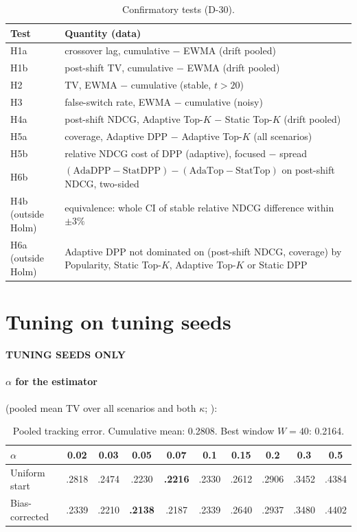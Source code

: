 \documentclass[11pt,a4paper]{article}
\newcommand{\statustag}[2]{\colorbox{#1}{\scriptsize\sffamily\bfseries #2}}
\newcommand{\tuning}{\statustag{gray!20}{TUNING SEEDS ONLY}}
\begin{document}
\begin{table}[h]\centering\small
\begin{tabularx}{\linewidth}{lX}
\toprule
Test & Quantity (data) \\
\midrule
H1a & crossover lag, cumulative $-$ EWMA (drift pooled) \\
H1b & post-shift TV, cumulative $-$ EWMA (drift pooled) \\
H2 & TV, EWMA $-$ cumulative (stable, $t>20$) \\
H3 & false-switch rate, EWMA $-$ cumulative (noisy) \\
H4a & post-shift NDCG, Adaptive Top-$K$ $-$ Static Top-$K$ (drift pooled) \\
H5a & coverage, Adaptive DPP $-$ Adaptive Top-$K$ (all scenarios) \\
H5b & relative NDCG cost of DPP (adaptive), focused $-$ spread \\
H6b & $(\text{AdaDPP}-\text{StatDPP})-(\text{AdaTop}-\text{StatTop})$ on post-shift NDCG, two-sided \\
\midrule
H4b (outside Holm) & equivalence: whole CI of stable relative NDCG difference within $\pm3\%$ \\
H6a (outside Holm) & Adaptive DPP not dominated on (post-shift NDCG, coverage) by Popularity, Static Top-$K$, Adaptive Top-$K$ or Static DPP \\
\bottomrule
\end{tabularx}
\caption{Confirmatory tests (D-30).}
\end{table}

\section{Tuning on tuning seeds}\label{sec:tuning}
\tuning

\paragraph{$\alpha$ for the estimator} (pooled mean TV over all scenarios and both $\kappa$;
):

\begin{table}[h]\centering\small
\begin{tabular}{lccccccccc}
\toprule
$\alpha$ & 0.02 & 0.03 & 0.05 & 0.07 & 0.1 & 0.15 & 0.2 & 0.3 & 0.5 \\
\midrule
Uniform start  & .2818 & .2474 & .2230 & \textbf{.2216} & .2330 & .2612 & .2906 & .3452 & .4384 \\
Bias-corrected & .2339 & .2210 & \textbf{.2138} & .2187 & .2339 & .2640 & .2937 & .3480 & .4402 \\
\bottomrule
\end{tabular}
\caption{Pooled tracking error. Cumulative mean: 0.2808. Best window $W=40$: 0.2164.}
\end{table}
\end{document}
